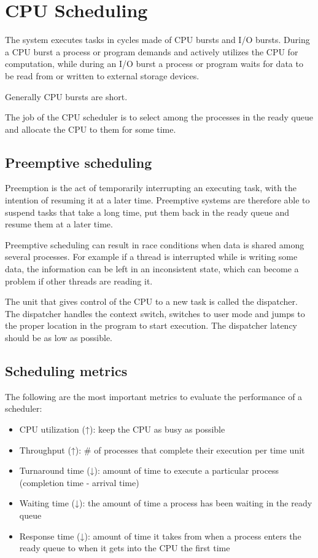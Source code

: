 \chapter{CPU Scheduling}

The system executes tasks in cycles made of CPU bursts and I/O bursts. During a CPU burst a process or program demands and actively utilizes the CPU for computation, while during an I/O burst a process or program waits for data to be read from or written to external storage devices. 


Generally CPU bursts are short.


The job of the CPU scheduler is to select among the processes in the ready queue and allocate the CPU to them for some time.

\section{Preemptive scheduling}
Preemption is the act of temporarily interrupting an executing task, with the intention of resuming it at a later time. Preemptive systems are therefore able to suspend tasks that take a long time, put them back in the ready queue and resume them at a later time. 

Preemptive scheduling can result in race conditions when data is shared among several processes. For example if a thread is interrupted while is writing some data, the information can be left in an inconsistent state, which can become a problem if other threads are reading it.

The unit that gives control of the CPU to a new task is called the dispatcher. The dispatcher handles the context switch, switches to user mode and jumps to the proper location in the program to start execution. The dispatcher latency should be as low as possible.

\section{Scheduling metrics}
The following are the most important metrics to evaluate the performance of a scheduler:
\begin{itemize}
    \item CPU utilization (↑): keep the CPU as busy as possible
    \item Throughput (↑): \# of processes that complete their execution per time unit
    \item Turnaround time (↓): amount of time to execute a particular process (completion time - arrival time)
    \item Waiting time (↓): the amount of time a process has been waiting in the ready queue
    \item Response time (↓): amount of time it takes from when a process enters the ready queue to when it gets into the CPU the first time
\end{itemize}

